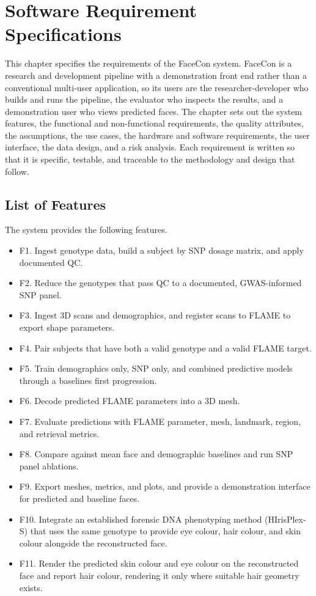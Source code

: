 \chapter{Software Requirement Specifications}
\label{ch:srs}
This chapter specifies the requirements of the FaceCon system. FaceCon is a research and development pipeline with a demonstration front end rather than a conventional multi-user application, so its users are the researcher-developer who builds and runs the pipeline, the evaluator who inspects the results, and a demonstration user who views predicted faces. The chapter sets out the system features, the functional and non-functional requirements, the quality attributes, the assumptions, the use cases, the hardware and software requirements, the user interface, the data design, and a risk analysis. Each requirement is written so that it is specific, testable, and traceable to the methodology and design that follow.

\section{List of Features}
The system provides the following features.
\begin{itemize}
\item F1. Ingest genotype data, build a subject by SNP dosage matrix, and apply documented QC.
\item F2. Reduce the genotypes that pass QC to a documented, GWAS-informed SNP panel.
\item F3. Ingest 3D scans and demographics, and register scans to FLAME to export shape parameters.
\item F4. Pair subjects that have both a valid genotype and a valid FLAME target.
\item F5. Train demographics only, SNP only, and combined predictive models through a baselines first progression.
\item F6. Decode predicted FLAME parameters into a 3D mesh.
\item F7. Evaluate predictions with FLAME parameter, mesh, landmark, region, and retrieval metrics.
\item F8. Compare against mean face and demographic baselines and run SNP panel ablations.
\item F9. Export meshes, metrics, and plots, and provide a demonstration interface for predicted and baseline faces.
\item F10. Integrate an established forensic DNA phenotyping method (HIrisPlex-S) that uses the same genotype to provide eye colour, hair colour, and skin colour alongside the reconstructed face.
\item F11. Render the predicted skin colour and eye colour on the reconstructed face and report hair colour, rendering it only where suitable hair geometry exists.
\end{itemize}


